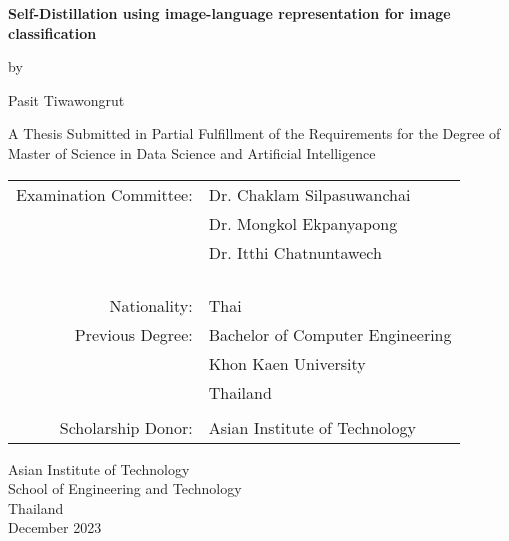 \begin{titlepage}
  \begin{center}
   
  \textbf{\large{ Self-Distillation using image-language representation for image classification }}

  \vspace{3em} %
  
  by
  
  \vspace{3em} %
  
  Pasit Tiwawongrut
  
  \vspace{4em} %

  A Thesis Submitted in Partial Fulfillment of the Requirements for the Degree of Master of Science in Data Science and Artificial Intelligence

  \vspace{4em} %

\begin{center}
  \begin{tabular}{ rl }
Examination Committee: & Dr. Chaklam Silpasuwanchai \\
                       & Dr. Mongkol Ekpanyapong \\
                       & Dr. Itthi Chatnuntawech \\\\
                       
\\ \\ \\
Nationality:     & Thai \\
Previous Degree: & Bachelor of Computer Engineering \\
                 & Khon Kaen University \\
                 & Thailand \\
\\
Scholarship Donor: & Asian Institute of Technology
  \end{tabular}
\end{center}

\vspace{3em}

Asian Institute of Technology \\
School of Engineering and Technology \\
Thailand \\           
December 2023


  \end{center}
\end{titlepage}
